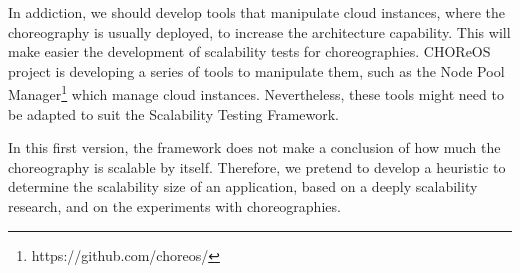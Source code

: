 In addiction, we should develop tools that manipulate cloud instances, where the choreography is usually deployed, to increase the architecture capability. This will make easier the development of scalability tests for choreographies. CHOReOS project is developing a series of tools to manipulate them, such as the Node Pool Manager\footnote{https://github.com/choreos/} which manage cloud instances. Nevertheless, these tools might need to be adapted to suit the Scalability Testing Framework.

In this first version, the framework does not make a conclusion of how much the choreography is scalable by itself. Therefore, we pretend to develop a heuristic to determine the scalability size of an application, based on a deeply scalability research, and on the experiments with choreographies.